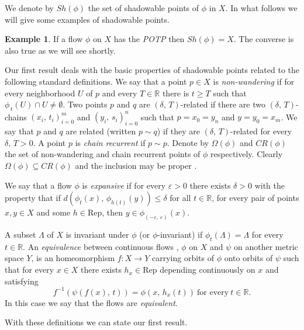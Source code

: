 \documentclass{amsart}
\theoremstyle{definition}
\newtheorem{example}[theorem]{Example}
\begin{document}
We denote by $Sh(\phi)$ the set of shadowable  points of $\phi$ in $X$. In what follows we will give some examples of shadowable points.

\begin{example}
If a flow $\phi$ on $X$ has the {\em POTP} then $Sh(\phi)= X$. The converse is also true as we will see shortly.
\end{example}


Our first result deals with the basic properties of shadowable points related to the following standard definitions. We say that a point $p\in X$ is \emph{non-wandering} if for every neighborhood $U$ of $p$ and every $T\in\mathbb{R}$ there is $t\geq T$ such that $\phi_{\,t}(U)\cap U\neq\emptyset$. Two points $p$ and $q$ are $(\delta,\,T)$-related if there are two  $(\delta,\,T)$-chains $(x_i,\,t_i)_{i=0}^m$ and  $(y_i,\,s_i)_{i=0}^n$ such that $p=x_0=y_n$ and $y=y_0=x_m$. We say that $p$ and $q$ are related (written $p \sim q$) if they are $(\delta,\,T)$-related for every $\delta,\,T >0$. A point $p$ is \emph{chain recurrent} if $p\sim p$. Denote by $\Omega(\phi)$ and $CR(\phi)$ the set of non-wandering and chain recurrent points of $\phi$ respectively. Clearly $\Omega(\phi)\subseteq CR(\phi)$ and the inclusion may be proper \cite{Alongi07}.
 
We say that a flow $\phi$ is {\em expansive} if for every $\varepsilon>0$ there exists $\delta>0$ with the property that if $d(\phi_t(x),\, \phi_{h(t)}(y))\leq \delta$ for all $t\in \mathbb{R}$, for every pair of points $x,y\in X$ and some $h\in \mathrm{Rep}$, then $y\in\phi_{(-\varepsilon,\,\varepsilon)}(x)$.  
 
A subset $\Lambda$ of $X$ is invariant under $\phi$ (or $\phi$-invariant) if  $\phi_t(\Lambda)= \Lambda$ for every $t\in \mathbb{R}$.  An \emph{equivalence} between continuous flows \cite{Thomas84}, $\phi$ on $X$ and $\psi$ on another metric space $Y$, is an homeomorphism $f:X\rightarrow Y$ carrying orbits of $\phi$ onto orbits of $\psi$ such that for every $x\in X$ there exists $h_x\in \mathrm{Rep}$ depending continuously on $x$ and satisfying 
$$f^{-1}(\psi(f(x),\,t))=\phi(x,\,h_x(t)) \ \mbox{for every}\  t\in \mathbb{R}.$$
In this case we say that the flows are \emph{equivalent}.

With these definitions we can state our first result.
\end{document}
